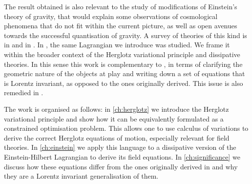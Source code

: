 \documentclass[../main.tex]{subfiles}
\begin{document}
The result obtained is also relevant to the study of modifications of Einstein's theory of
gravity, that would explain some observations of cosmological phenomena that do not fit
within the current picture, as well as open avenues towards the successful quantisation of
gravity. A survey of theories of this kind is in \cite{Olmo2020} and in
\cite{baker_strong_2017}. In \cite{Lazo2017,Lazo2021}, the same Lagrangian we introduce
was studied. We frame it within the broader context of the Herglotz variational principle
and dissipative theories. In this sense this work is complementary to \cite{Lazo2017}, in
terms of clarifying the geometric nature of the objects at play and writing down a set of
equations that is Lorentz invariant, as opposed to the ones originally derived. This issue
is also remedied in \cite{Lazo2021}.

The work is organised as follows: in \cref{ch:herglotz} we introduce the Herglotz
variational principle and show how it can be equivalently formulated as a constrained
optimisation problem. This allows one to use calculus of variations to derive the correct
Herglotz equations of motion, especially relevant for field theories. In
\cref{ch:einstein} we apply this language to a dissipative version of the Einstein-Hilbert
Lagrangian to derive its field equations. In \cref{ch:significance} we discuss how these
equations differ from the ones originally derived in \cite{Lazo2017} and why they are a
Lorentz invariant generalisation of them.
\end{document}
